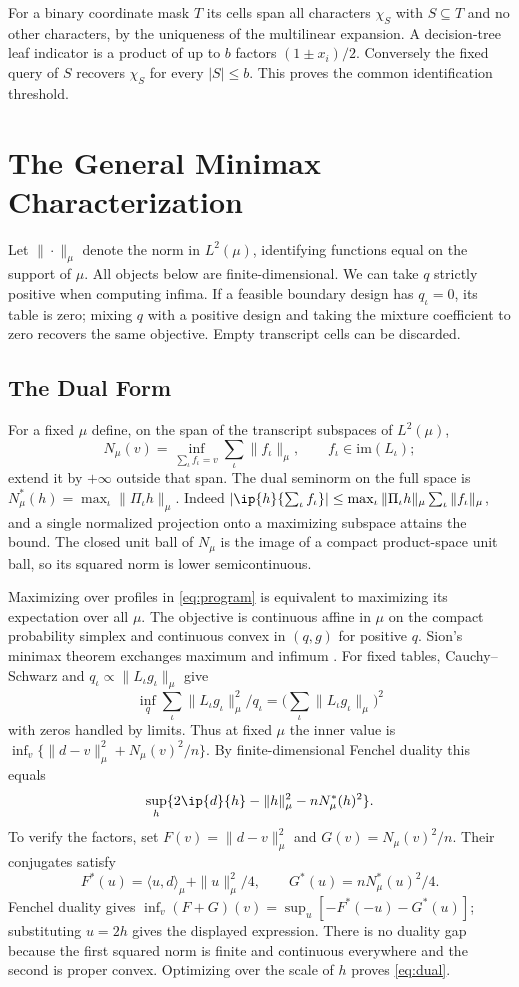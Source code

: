 For a binary coordinate mask $T$ its cells span all characters $\chi_S$ with $S\subseteq T$ and no other characters, by the uniqueness of the multilinear expansion. A decision-tree leaf indicator is a product of up to $b$ factors $(1\pm x_i)/2$. Conversely the fixed query of $S$ recovers $\chi_S$ for every $|S|\le b$. This proves the common identification threshold.

\section{The General Minimax Characterization}\label{app:general}
Let $\|\cdot\|_\mu$ denote the norm in $L^2(\mu)$, identifying functions equal on the support of $\mu$. All objects below are finite-dimensional. We can take $q$ strictly positive when computing infima. If a feasible boundary design has $q_\iota=0$, its table is zero; mixing $q$ with a positive design and taking the mixture coefficient to zero recovers the same objective. Empty transcript cells can be discarded.

\subsection{The Dual Form}
For a fixed $\mu$ define, on the span of the transcript subspaces of $L^2(\mu)$,
\[
 N_\mu(v)=\inf_{\sum_\iota f_\iota=v}\sum_\iota\|f_\iota\|_\mu,\qquad f_\iota\in\mathrm{im}(L_\iota);
\]
extend it by $+\infty$ outside that span. The dual seminorm on the full space is $N_\mu^*(h)=\max_\iota\|\Pi_\iota h\|_\mu$. Indeed $|\ip{h}{\sum_\iota f_\iota}|\le\max_\iota\|\Pi_\iota h\|_\mu\sum_\iota\|f_\iota\|_\mu$, and a single normalized projection onto a maximizing subspace attains the bound. The closed unit ball of $N_\mu$ is the image of a compact product-space unit ball, so its squared norm is lower semicontinuous.

Maximizing over profiles in \eqref{eq:program} is equivalent to maximizing its expectation over all $\mu$. The objective is continuous affine in $\mu$ on the compact probability simplex and continuous convex in $(q,g)$ for positive $q$. Sion's minimax theorem exchanges maximum and infimum \citep{sion1958}. For fixed tables, Cauchy--Schwarz and $q_\iota\propto\|L_\iota g_\iota\|_\mu$ give
\[
 \inf_q \sum_\iota\|L_\iota g_\iota\|_\mu^2/q_\iota
      =\Big(\sum_\iota\|L_\iota g_\iota\|_\mu\Big)^2
\]
with zeros handled by limits. Thus at fixed $\mu$ the inner value is $\inf_v \{\|d-v\|_\mu^2+N_\mu(v)^2/n\}$. By finite-dimensional Fenchel duality this equals
\[
 \sup_h\{2\ip{d}{h}-\|h\|_\mu^2-nN_\mu^*(h)^2\}.
\]
To verify the factors, set $F(v)=\|d-v\|_\mu^2$ and $G(v)=N_\mu(v)^2/n$. Their conjugates satisfy
\[
 F^*(u)=\langle u,d\rangle_\mu+\|u\|_\mu^2/4,
 \qquad G^*(u)=nN_\mu^*(u)^2/4.
\]
Fenchel duality gives $\inf_v(F+G)(v)=\sup_u[-F^*(-u)-G^*(u)]$; substituting $u=2h$ gives the displayed expression. There is no duality gap because the first squared norm is finite and continuous everywhere and the second is proper convex. Optimizing over the scale of $h$ proves \eqref{eq:dual}.

